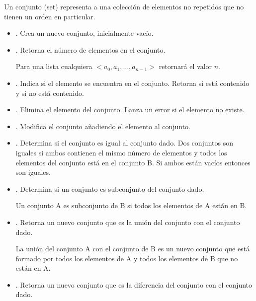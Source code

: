 

\begin{definition}[Set]{}Un conjunto (set) representa a una colección de elementos no repetidos que no tienen un orden en particular.

\begin{itemize}
\item {}. Crea un nuevo conjunto, inicialmente vacío.

\item {}. Retorna el número de elementos en el conjunto.

Para una lista cualquiera $<a_0, a_1, \ldots, a_{n-1}>$ retornará el valor $n$.

\item {}. Indica si el elemento  se encuentra en el conjunto. Retorna  si está contenido y  si no está contenido.


\item {}. Elimina el elemento  del conjunto. Lanza un error si el elemento no existe.


\item {}. Modifica el conjunto añadiendo  el elemento  al conjunto.


\item {}. Determina si el conjunto es igual al conjunto dado. Dos conjuntos son iguales si ambos contienen el mismo número de elementos y todos los elementos del conjunto está en el conjunto B. Si ambos están vacíos entonces son iguales.


\item {}. Determina si un conjunto es subconjunto del conjunto dado. 

Un conjunto A es subconjunto de B si todos los elementos de A están en B.


\item {}. Retorna un nuevo conjunto que es la unión del conjunto con el conjunto dado.

La unión del conjunto A  con el conjunto de B es un nuevo conjunto que está formado por todos los elementos de A y todos los elementos de B que no están en A.


\item {}.  Retorna un nuevo conjunto que es la diferencia del conjunto con el conjunto dado.


\end{itemize}
\end{definition}
